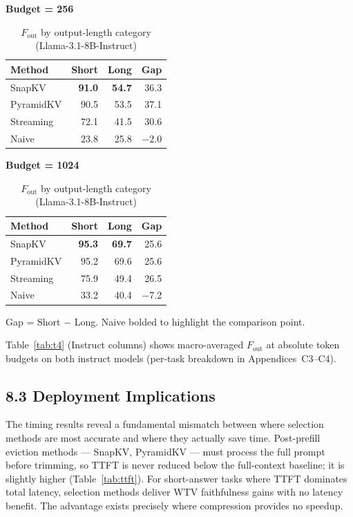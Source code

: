 \documentclass[10pt,letterpaper]{article}
\begin{document}
\begin{table}[H]
\centering
\small
\caption{\(F_{\text{out}}\) by output-length category (Llama-3.1-8B-Instruct)}
\label{tab:instruct-fout-shortlong}
\begin{minipage}[t]{0.47\textwidth}
\centering
\textbf{Budget = 256}\\[4pt]
\begin{tabular}{@{}lrrr@{}}
\toprule
Method & Short & Long & Gap\\
\midrule
SnapKV    & \textbf{91.0} & \textbf{54.7} & 36.3\\
PyramidKV & 90.5 & 53.5 & 37.1\\
Streaming & 72.1 & 41.5 & 30.6\\
Naive     & 23.8 & 25.8 & $-$2.0\\
\bottomrule
\end{tabular}
\end{minipage}
\hfill
\begin{minipage}[t]{0.47\textwidth}
\centering
\textbf{Budget = 1024}\\[4pt]
\begin{tabular}{@{}lrrr@{}}
\toprule
Method & Short & Long & Gap\\
\midrule
SnapKV    & \textbf{95.3} & \textbf{69.7} & 25.6\\
PyramidKV & 95.2 & 69.6 & 25.6\\
Streaming & 75.9 & 49.4 & 26.5\\
Naive     & 33.2 & 40.4 & $-$7.2\\
\bottomrule
\end{tabular}
\end{minipage}

\medskip
Gap = Short $-$ Long.  Naive bolded to highlight the comparison point.
\end{table}

Table~\ref{tab:t4} (Instruct columns) shows macro-averaged \(F_{\text{out}}\) at absolute token budgets on both instruct models (per-task breakdown in Appendices~C3--C4).

\subsection{8.3 Deployment Implications}\label{deployment-implications}

The timing results reveal a fundamental mismatch between where selection methods
are most accurate and where they actually save time. Post-prefill eviction methods
--- SnapKV, PyramidKV --- must process the full prompt before trimming, so TTFT is
never reduced below the full-context baseline; it is slightly higher
(Table~\ref{tab:ttft}). For short-answer tasks where TTFT dominates total latency,
selection methods deliver WTV faithfulness gains with no latency benefit. The
advantage exists precisely where compression provides no speedup.
\end{document}
